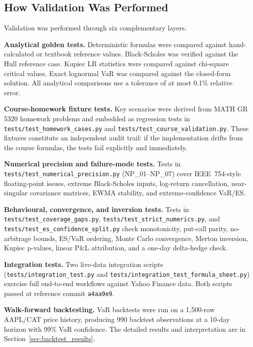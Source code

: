 \documentclass[11pt]{article}
\newcommand{\code}[1]{\texttt{#1}}
\begin{document}
\subsection{How Validation Was Performed}

Validation was performed through six complementary layers.

\textbf{Analytical golden tests.}  Deterministic formulas were compared against
hand-calculated or textbook reference values.  Black-Scholes was verified against
the Hull reference case.  Kupiec LR statistics were compared against chi-square
critical values.  Exact lognormal VaR was compared against the closed-form
solution.  All analytical comparisons use a tolerance of at most 0.1\% relative
error.

\textbf{Course-homework fixture tests.}  Key scenarios were derived from MATH GR
5320 homework problems and embedded as regression tests in
\code{tests/\allowbreak test\_homework\_cases.py} and
\code{tests/\allowbreak test\_course\_validation.py}.  These fixtures constitute
an independent audit trail: if the implementation drifts from the course
formulas, the tests fail explicitly and immediately.

\textbf{Numerical precision and failure-mode tests.}  Tests in
\code{tests/\allowbreak test\_numerical\_\allowbreak precision.py}
(NP\_01--NP\_07) cover IEEE~754-style floating-point issues, extreme
Black-Scholes inputs, log-return cancellation, near-singular covariance matrices,
EWMA stability, and extreme-confidence VaR/ES.

\textbf{Behavioural, convergence, and inversion tests.}  Tests in
\code{tests/\allowbreak test\_coverage\_gaps.py},
\code{tests/\allowbreak test\_strict\_\allowbreak numerics.py}, and
\code{tests/\allowbreak test\_es\_\allowbreak confidence\_split.py} check
monotonicity, put-call parity, no-arbitrage bounds, ES/VaR ordering, Monte Carlo
convergence, Merton inversion, Kupiec p-values, linear P\&L attribution, and a
one-day delta-hedge check.

\textbf{Integration tests.}  Two live-data integration scripts
(\code{tests/\allowbreak integration\_test.py} and
\code{tests/\allowbreak integration\_test\_formula\_sheet.py}) exercise full
end-to-end workflows against Yahoo Finance data.  Both scripts passed at
reference commit \code{a4aa9e9}.

\textbf{Walk-forward backtesting.}  VaR backtests were run on a 1,500-row
AAPL/CAT price history, producing 990 backtest observations at a 10-day horizon
with 99\% VaR confidence.  The detailed results and interpretation are in
Section~\ref{sec:backtest_results}.
\end{document}
